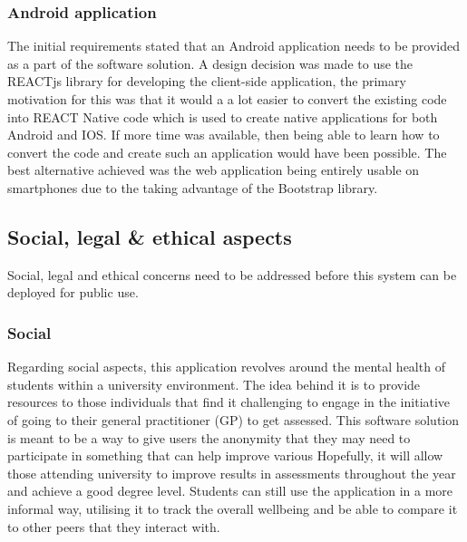 \subsubsection*{Android application}
The initial requirements stated that an Android application needs to be provided as a part of the software solution.
A design decision was made to use the REACTjs library for developing the client-side application, the primary motivation for this was that it would a 
a lot easier to convert the existing code into REACT Native code which is used to create native applications for both Android and IOS.
If more time was available, then being able to learn how to convert the code and create such an application would have been possible.
The best alternative achieved was the web application being entirely usable on smartphones due to the taking advantage of
the Bootstrap library.


\subsection{Social, legal \& ethical aspects}
Social, legal and ethical concerns need to be addressed before this system can be deployed for public use.

\subsubsection{Social}

Regarding social aspects, this application revolves around the mental health of students within a university environment.
The idea behind it is to provide resources to those individuals that find it challenging to engage in the initiative of going to their general practitioner
(GP) to get assessed.
This software solution is meant to be a way to give users the anonymity that they may need to participate in something that can help improve 
various 
Hopefully, it will allow those attending university to improve results in assessments throughout the year and achieve a good degree level.
Students can still use the application in a more informal way, utilising it to track the overall wellbeing and be able to compare it to other peers that
they interact with.


